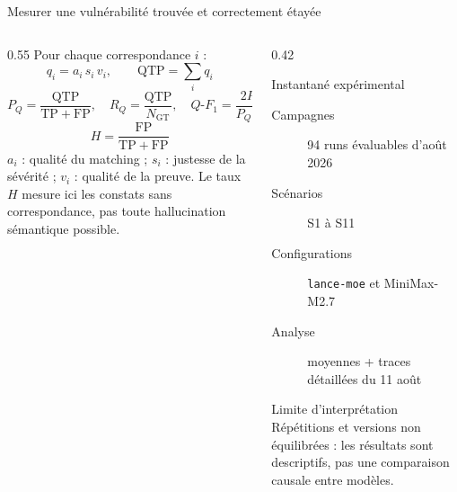 \documentclass[aspectratio=169,10pt]{beamer}
\begin{document}
\begin{frame}{Mesurer une vulnérabilité trouvée et correctement étayée}
  \begin{columns}[T,onlytextwidth]
    \begin{column}{0.55\textwidth}
      Pour chaque correspondance $i$ :
      \[
        q_i=a_i\,s_i\,v_i, \qquad \mathrm{QTP}=\sum_i q_i
      \]
      \[
        P_Q=\frac{\mathrm{QTP}}{\mathrm{TP}+\mathrm{FP}},\quad
        R_Q=\frac{\mathrm{QTP}}{N_{\mathrm{GT}}},\quad
        Q\text{-}F_1=\frac{2P_QR_Q}{P_Q+R_Q}
      \]
      \[
        H=\frac{\mathrm{FP}}{\mathrm{TP}+\mathrm{FP}}
      \]
      \scriptsize $a_i$ : qualité du matching ; $s_i$ : justesse de la sévérité ;
      $v_i$ : qualité de la preuve. Le taux $H$ mesure ici les constats sans
      correspondance, pas toute hallucination sémantique possible.
    \end{column}
    \begin{column}{0.42\textwidth}
      \begin{block}{Instantané expérimental}
        \begin{description}
          \item[Campagnes] 94 runs évaluables d'août 2026
          \item[Scénarios] S1 à S11
          \item[Configurations] \texttt{lance-moe} et MiniMax-M2.7
          \item[Analyse] moyennes + traces détaillées du 11 août
        \end{description}
      \end{block}
      \begin{alertblock}{Limite d'interprétation}
        Répétitions et versions non équilibrées : les résultats sont descriptifs,
        pas une comparaison causale entre modèles.
      \end{alertblock}
    \end{column}
  \end{columns}
\end{frame}
\end{document}
